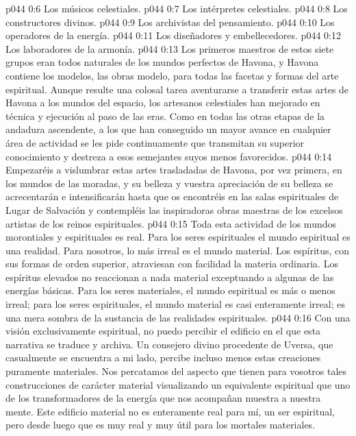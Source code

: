 \vs p044 0:6 Los músicos celestiales.
\vs p044 0:7 Los intérpretes celestiales.
\vs p044 0:8 Los constructores divinos.
\vs p044 0:9 Los archivistas del pensamiento.
\vs p044 0:10 Los operadores de la energía.
\vs p044 0:11 Los diseñadores y embellecedores.
\vs p044 0:12 Los laboradores de la armonía.
\vs p044 0:13 \pc Los primeros maestros de estos siete grupos eran todos naturales de los mundos perfectos de Havona, y Havona contiene los modelos, las obras modelo, para todas las facetas y formas del arte espiritual. Aunque resulte una colosal tarea aventurarse a transferir estas artes de Havona a los mundos del espacio, los artesanos celestiales han mejorado en técnica y ejecución al paso de las eras. Como en todas las otras etapas de la andadura ascendente, a los que han conseguido un mayor avance en cualquier área de actividad se les pide continuamente que transmitan su superior conocimiento y destreza a esos semejantes suyos menos favorecidos.
\vs p044 0:14 Empezaréis a vislumbrar estas artes trasladadas de Havona, por vez primera, en los mundos de las moradas, y su belleza y vuestra apreciación de su belleza se acrecentarán e intensificarán hasta que os encontréis en las salas espirituales de Lugar de Salvación y contempléis las inspiradoras obras maestras de los excelsos artistas de los reinos espirituales.
\vs p044 0:15 \pc Toda esta actividad de los mundos morontiales y espirituales es real. Para los seres espirituales el mundo espiritual es una realidad. Para nosotros, lo más irreal es el mundo material. Los espíritus, con sus formas de orden superior, atraviesan con facilidad la materia ordinaria. Los espíritus elevados no reaccionan a nada material exceptuando a algunas de las energías básicas. Para los seres materiales, el mundo espiritual es más o menos irreal; para los seres espirituales, el mundo material es casi enteramente irreal; es una mera sombra de la sustancia de las realidades espirituales.
\vs p044 0:16 Con una visión exclusivamente espiritual, no puedo percibir el edificio en el que esta narrativa se traduce y archiva. Un consejero divino procedente de Uversa, que casualmente se encuentra a mi lado, percibe incluso menos estas creaciones puramente materiales. Nos percatamos del aspecto que tienen para vosotros tales construcciones de carácter material visualizando un equivalente espiritual que uno de los transformadores de la energía que nos acompañan muestra a nuestra mente. Este edificio material no es enteramente real para mí, un ser espiritual, pero desde luego que es muy real y muy útil para los mortales materiales.

